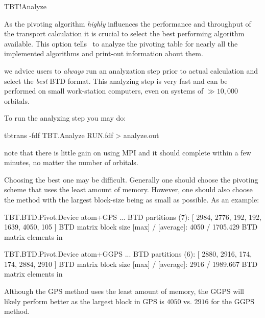\begin{fdflogicalF}{TBT!Analyze}

  As the pivoting algorithm \emph{highly} influences the performance
  and throughput of the transport calculation it is crucial to select
  the best performing algorithm available. This option tells \tbtrans\
  to analyze the pivoting table for nearly all the implemented
  algorithms and print-out information about them.

  \note we advice users to \emph{always} run an analyzation step prior
  to actual calculation and select the \emph{best} BTD format. This
  analyzing step is very fast and can be performed on small
  work-station computers, even on systems of $\gg10,000$ orbitals.

  To run the analyzing step you may do:
  \begin{shellexample}
    tbtrans -fdf TBT.Analyze RUN.fdf > analyze.out
  \end{shellexample}
  note that there is little gain on using MPI and it should complete
  within a few minutes, no matter the number of orbitals.

  Choosing the best one may be difficult. Generally one should choose
  the pivoting scheme that uses the least amount of memory. However,
  one should also choose the method with the largest block-size being
  as small as possible. As an example:
  \begin{shellexample}
TBT.BTD.Pivot.Device atom+GPS
...
    BTD partitions (7): 
     [ 2984, 2776, 192, 192, 1639, 4050, 105 ]
    BTD matrix block size [max] / [average]: 4050 /   1705.429
    BTD matrix elements in %

TBT.BTD.Pivot.Device atom+GGPS
...
    BTD partitions (6): 
     [ 2880, 2916, 174, 174, 2884, 2910 ]
    BTD matrix block size [max] / [average]: 2916 /   1989.667
    BTD matrix elements in %

  \end{shellexample}
  Although the GPS method uses the least amount of memory, the GGPS
  will likely perform better as the largest block in GPS is $4050$
  vs. $2916$ for the GGPS method. 

\end{fdflogicalF}


